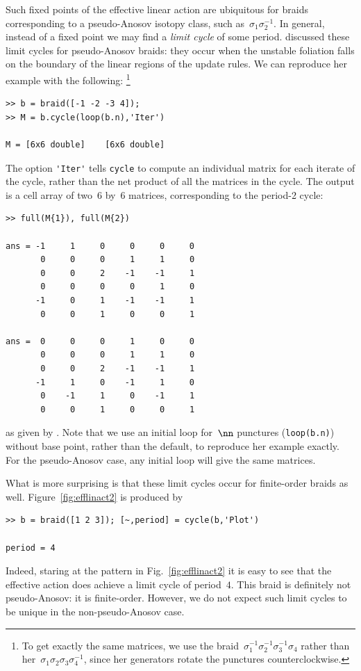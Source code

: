 \documentclass[12pt]{article}
\begin{document}
%
Such fixed points of the effective linear action are ubiquitous for braids
corresponding to a pseudo-Anosov isotopy class, such
as~$\sigma_1\sigma_2^{-1}$. %
In general, instead of a fixed point we may find a \emph{limit cycle} of some
period.  \citet{Yurttas2014_preprint} discussed these limit cycles for
pseudo-Anosov braids: they occur when the unstable foliation falls on the
boundary of the linear regions of the update rules.  We can reproduce her
example with the following:%
\footnote{To get exactly the same matrices, we use the
  braid~$\sigma_1^{-1}\sigma_2^{-1}\sigma_3^{-1}\sigma_4$ rather than
  her~$\sigma_1\sigma_2\sigma_3\sigma_4^{-1}$, since her generators rotate the
  punctures counterclockwise.}
%
\begin{lstlisting}[frame=single,framerule=0pt]
>> b = braid([-1 -2 -3 4]);
>> M = b.cycle(loop(b.n),'Iter')

M = [6x6 double]    [6x6 double]
\end{lstlisting}
The option \lstinline{'Iter'} tells \lstinline{cycle} to compute an individual
matrix for each iterate of the cycle, rather than the net product of all the
matrices in the cycle.  The output is a cell array %
%
of two~$6$ by~$6$ matrices, corresponding to the period-2 cycle:
\begin{lstlisting}[frame=single,framerule=0pt]
>> full(M{1}), full(M{2})

ans = -1     1     0     0     0     0
       0     0     0     1     1     0
       0     0     2    -1    -1     1
       0     0     0     0     1     0
      -1     0     1    -1    -1     1
       0     0     1     0     0     1

ans =  0     0     0     1     0     0
       0     0     0     1     1     0
       0     0     2    -1    -1     1
      -1     1     0    -1     1     0
       0    -1     1     0    -1     1
       0     0     1     0     0     1
\end{lstlisting}
as given by \citet{Yurttas2014_preprint}.  Note that we use an initial loop
for~$\nn$ punctures (\lstinline{loop(b.n)}) without base point, rather than
the default, to reproduce her example exactly.  For the pseudo-Anosov case,
any initial loop will give the same matrices.

What is more surprising is that these limit cycles occur for finite-order
braids as well.  Figure~\ref{fig:efflinact2} is produced by
\begin{lstlisting}[frame=single,framerule=0pt]
>> b = braid([1 2 3]); [~,period] = cycle(b,'Plot')

period = 4
\end{lstlisting}
Indeed, staring at the pattern in Fig.~\ref{fig:efflinact2} it is easy to see
that the effective action does achieve a limit cycle of period~$4$.  This
braid is definitely not pseudo-Anosov: it is finite-order.
%
However, we do not expect such limit cycles to be unique in the
non-pseudo-Anosov case.
\end{document}
